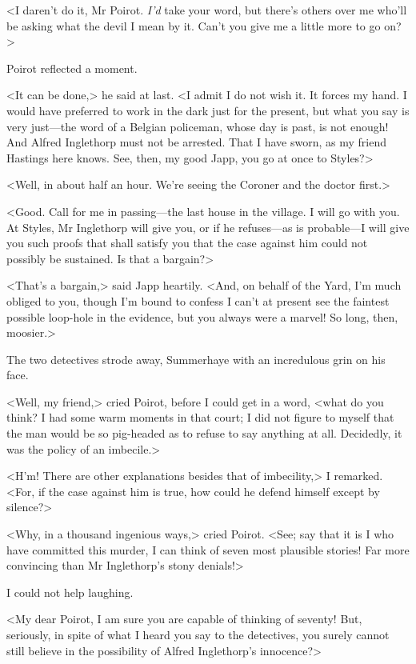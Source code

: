  <I daren't do it, Mr Poirot. \emph{I'd} take your word, but there's others over me who'll be asking what the devil I mean by it. Can't you give me a little more to go on?> 

 Poirot reflected a moment. 

 <It can be done,> he said at last. <I admit I do not wish it. It forces my hand. I would have preferred to work in the dark just for the present, but what you say is very just—the word of a Belgian policeman, whose day is past, is not enough! And Alfred Inglethorp must not be arrested. That I have sworn, as my friend Hastings here knows. See, then, my good Japp, you go at once to Styles?> 

 <Well, in about half an hour. We're seeing the Coroner and the doctor first.> 

 <Good. Call for me in passing—the last house in the village. I will go with you. At Styles, Mr Inglethorp will give you, or if he refuses—as is probable—I will give you such proofs that shall satisfy you that the case against him could not possibly be sustained. Is that a bargain?> 

 <That's a bargain,> said Japp heartily. <And, on behalf of the Yard, I'm much obliged to you, though I'm bound to confess I can't at present see the faintest possible loop-hole in the evidence, but you always were a marvel! So long, then, moosier.> 

 The two detectives strode away, Summerhaye with an incredulous grin on his face. 

 <Well, my friend,> cried Poirot, before I could get in a word, <what do you think?  I had some warm moments in that court; I did not figure to myself that the man would be so pig-headed as to refuse to say anything at all. Decidedly, it was the policy of an imbecile.> 

 <H'm! There are other explanations besides that of imbecility,> I remarked. <For, if the case against him is true, how could he defend himself except by silence?> 

 <Why, in a thousand ingenious ways,> cried Poirot. <See; say that it is I who have committed this murder, I can think of seven most plausible stories! Far more convincing than Mr Inglethorp's stony denials!> 

 I could not help laughing. 

 <My dear Poirot, I am sure you are capable of thinking of seventy! But, seriously, in spite of what I heard you say to the detectives, you surely cannot still believe in the possibility of Alfred Inglethorp's innocence?> 


